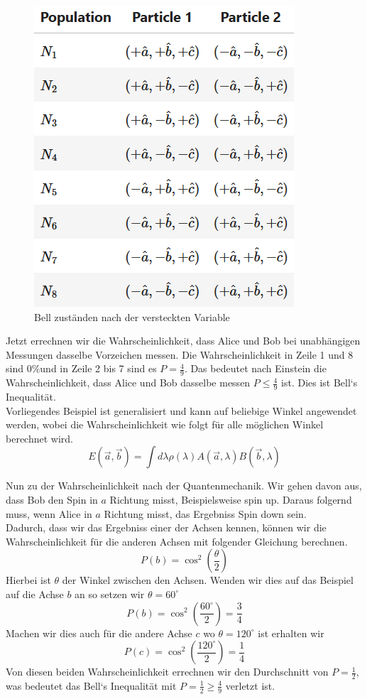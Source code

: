 \begin{figure}[H]
    \centering
    \includegraphics[width=0.5\linewidth]{img/BellList.png}
    \caption{Bell zuständen nach der versteckten Variable}
    \label{fig:BellList}
\end{figure}

Jetzt errechnen wir die Wahrscheinlichkeit, dass Alice und Bob bei unabhängigen Messungen dasselbe Vorzeichen messen. Die Wahrscheinlichkeit in Zeile 1 und 8 sind $0\%$und in Zeile 2 bis 7 sind es $P = \frac{4}{9}$.
Das bedeutet nach Einstein die Wahrscheinlichkeit, dass Alice und Bob dasselbe messen $P \leq \frac{4}{9}$ ist. Dies ist Bell`s Inequalität.\\
Vorliegendes Beispiel ist generalisiert und kann auf beliebige Winkel angewendet werden, wobei die Wahrscheinlichkeit wie folgt für alle möglichen Winkel berechnet wird.
\begin{equation}
    E(\overrightarrow{a}, \overrightarrow{b}) = \int d\lambda \rho(\lambda) A(\overrightarrow{a}, \lambda) B(\overrightarrow{b}, \lambda)
\end{equation}

Nun zu der Wahrscheinlichkeit nach der Quantenmechanik. Wir gehen davon aus, dass Bob den Spin in $a$ Richtung misst, Beispielsweise spin up. Daraus folgernd muss, wenn Alice in $a$ Richtung misst, das Ergebniss Spin down sein.\\
Dadurch, dass wir das Ergebniss einer der Achsen kennen, können wir die Wahrscheinlichkeit für die anderen Achsen mit folgender Gleichung berechnen.
\begin{equation}
    P(b) = \cos^2(\frac{\theta}{2})
\end{equation}
Hierbei ist $\theta$ der Winkel zwischen den Achsen. Wenden wir dies auf das Beispiel auf die Achse $b$ an so setzen wir $\theta = 60^\circ$
\begin{equation}
    P(b) = \cos^2(\frac{60^\circ}{2}) = \frac{3}{4}
\end{equation}
Machen wir dies auch für die andere Achse $c$ wo $\theta = 120^\circ$ ist erhalten wir
\begin{equation}
    P(c) = \cos^2(\frac{120^\circ}{2}) = \frac{1}{4}
\end{equation}
Von diesen beiden Wahrscheinlichkeit errechnen wir den Durchschnitt von $P = \frac{1}{2}$, was bedeutet das Bell`s Inequalität mit $P = \frac{1}{2} \ge \frac{4}{9}$ verletzt ist.\\

